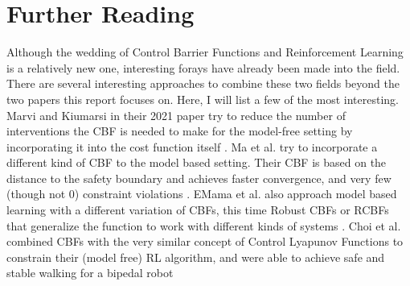 \documentclass{article}
\begin{document}
\section{Further Reading}
Although the wedding of Control Barrier Functions and Reinforcement Learning is a relatively new one, interesting forays have already been made into the field. There are several interesting approaches to combine these two fields beyond the two papers this report focuses on. Here, I will list a few of the most interesting. Marvi and Kiumarsi in their 2021 paper try to reduce the number of interventions the CBF is needed to make for the model-free setting by incorporating it into the cost function itself \cite{marvi2021safe}. Ma et al. try to incorporate a different kind of CBF to the model based setting. Their CBF is based on the distance to the safety boundary and achieves faster convergence, and very few (though not 0) constraint violations \cite{ma2021model}. EMama et al. also approach model based learning with a different variation of CBFs, this time Robust CBFs or RCBFs that generalize the function to work with different kinds of systems \cite{emam2021safe}. Choi et al. combined CBFs with the very similar concept of Control Lyapunov Functions to constrain their (model free) RL algorithm, and were able to achieve safe and stable walking for a bipedal robot \cite{choi2020reinforcement}
\newpage


\end{document}
